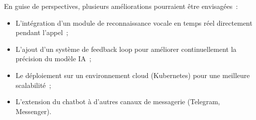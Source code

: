 \indent En guise de perspectives, plusieurs am\'{e}liorations pourraient \^{e}tre envisag\'{e}es~:

\begin{itemize}
    \item L'int\'{e}gration d'un module de reconnaissance vocale en temps r\'{e}el directement pendant l'appel~;
    \item L'ajout d'un syst\`{e}me de feedback loop pour am\'{e}liorer continuellement la pr\'{e}cision du mod\`{e}le IA~;
    \item Le d\'{e}ploiement sur un environnement cloud (Kubernetes) pour une meilleure scalabilit\'{e}~;
    \item L'extension du chatbot \`{a} d'autres canaux de messagerie (Telegram, Messenger).
\end{itemize}
